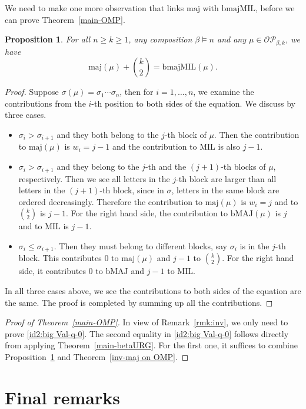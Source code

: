 \documentclass[12pt]{amsart}
\numberwithin{equation}{section}
\theoremstyle{plain}
\newtheorem{proposition}[theorem]{Proposition}
\theoremstyle{definition}
\def\MIL{\mathrm{MIL}}
\def\bMAJ{\mathrm{bMAJ}}
\def\bmajMIL{\mathrm{bmajMIL}}
\def\maj{\mathrm{maj}}
\def\OP{\mathcal{OP}}
\begin{document}
We need to make one more observation that links $\maj$ with $\bmajMIL$, before we can prove Theorem~\ref{main-OMP}.
\begin{proposition}\label{maj-bmajMIL}
For all $n\ge k\ge 1$, any composition $\beta\models n$ and any $\mu\in\OP_{\beta,k}$, we have $$\maj(\mu)+\binom{k}{2}=\bmajMIL(\mu).$$
\end{proposition}
\begin{proof}
Suppose $\sigma(\mu)=\sigma_1\cdots\sigma_n$, then for $i=1,\ldots,n$, we examine the contributions from the $i$-th position to both sides of the equation. We discuss by three cases.
\begin{itemize}
	\item $\sigma_i>\sigma_{i+1}$ and they both belong to the $j$-th block of $\mu$. Then the contribution to $\maj(\mu)$ is $w_i=j-1$ and the contribution to $\MIL$ is also $j-1$.
	\item $\sigma_i>\sigma_{i+1}$ and they belong to the $j$-th and the $(j+1)$-th blocks of $\mu$, respectively. Then we see all letters in the $j$-th block are larger than all letters in the $(j+1)$-th block, since in $\sigma$, letters in the same block are ordered decreasingly. Therefore the contribution to $\maj(\mu)$ is $w_i=j$ and to $\binom{k}{2}$ is $j-1$. For the right hand side, the contribution to $\bMAJ(\mu)$ is $j$ and to $\MIL$ is $j-1$.
	\item $\sigma_i\le\sigma_{i+1}$. Then they must belong to different blocks, say $\sigma_i$ is in the $j$-th block. This contributes $0$ to $\maj(\mu)$ and $j-1$ to $\binom{k}{2}$. For the right hand side, it contributes $0$ to $\bMAJ$ and $j-1$ to $\MIL$.
\end{itemize}
In all three cases above, we see the contributions to both sides of the equation are the same. The proof is completed by summing up all the contributions.
\end{proof}

\begin{proof}[Proof of Theorem~\ref{main-OMP}]
In view of Remark~\ref{rmk:inv}, we only need to prove \eqref{id2:big Val-q-0}. The second equality in \eqref{id2:big Val-q-0} follows directly from applying Theorem~\ref{main-betaURG}. For the first one, it suffices to combine Proposition~\ref{maj-bmajMIL} and Theorem~\ref{inv-maj on OMP}.
\end{proof}


\section{Final remarks}\label{sec:conclusion}
\end{document}
